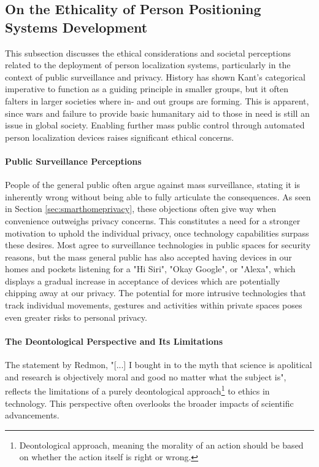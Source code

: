 \subsection{On the Ethicality of Person Positioning Systems Development}
\label{sec:discussion_ethics_localization_tech}
This subsection discusses the ethical considerations and societal perceptions related to the deployment of person localization systems, particularly in the context of public surveillance and privacy. History has shown Kant's categorical imperative to function as a guiding principle in smaller groups, but it often falters in larger societies where in- and out groups are forming. This is apparent, since wars and failure to provide basic humanitary aid to those in need is still an issue in global society. Enabling further mass public control through automated person localization devices raises significant ethical concerns. 

\paragraph{Public Surveillance Perceptions}
People of the general public often argue against mass surveillance, stating it is inherently wrong without being able to fully articulate the consequences. As seen in Section \ref{sec:smarthomeprivacy}, these objections often give way when convenience outweighs privacy concerns. This constitutes a need for a stronger motivation to uphold the individual privacy, once technology capabilities surpass these desires. Most agree to surveillance technologies in public spaces for security reasons, but the mass general public has also accepted having devices in our homes and pockets listening for a "Hi Siri", "Okay Google", or "Alexa", which displays a gradual increase in acceptance of devices which are potentially chipping away at our privacy. The potential for more intrusive technologies that track individual movements, gestures and activities within private spaces poses even greater risks to personal privacy. 

\paragraph{The Deontological Perspective and Its Limitations}
The statement by Redmon, "[...] I bought in to the myth that science is apolitical and research is objectively moral and good no matter what the subject is", reflects the limitations of a purely deontological approach\footnote{Deontological approach, meaning the morality of an action should be based on whether the action itself is right or wrong.} to ethics in technology. This perspective often overlooks the broader impacts of scientific advancements.

